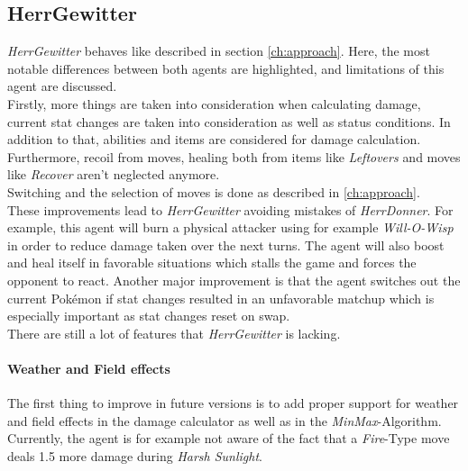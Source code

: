 \subsection{HerrGewitter}
\textit{HerrGewitter} behaves like described in section \ref{ch:approach}. Here, the most notable
differences between both agents are highlighted, and limitations of this agent are discussed. \\
Firstly, more things are taken into consideration when calculating damage, current stat changes are
taken into consideration as well as status conditions. In addition to that, abilities and items
are considered for damage calculation. Furthermore, recoil from moves, healing both from items
like \textit{Leftovers} \cite{Bulbapedia:Leftovers} and moves like \textit{Recover} aren't neglected
anymore. \\
Switching and the selection of moves is done as described in \ref{ch:approach}. \\
These improvements lead to \textit{HerrGewitter} avoiding mistakes of \textit{HerrDonner}. For example,
this agent will burn a physical attacker using for example \textit{Will-O-Wisp} \cite{Bulbapedia:Will-O-Wisp}
in order to reduce damage taken over the next turns. The agent will also boost and heal itself in favorable
situations which stalls the game and forces the opponent to react. Another major improvement is that the
agent switches out the current Pokémon if stat changes resulted in an unfavorable matchup which is especially
important as stat changes reset on swap. \\
There are still a lot of features that \textit{HerrGewitter} is lacking. 

\paragraph{Weather and Field effects}
The first thing to improve in future versions is to add proper support for weather and field effects in 
the damage calculator as well as in the \textit{MinMax}-Algorithm. Currently, the agent is for example
not aware of the fact that a \textit{Fire}-Type move deals 1.5 more damage during \textit{Harsh Sunlight}.

